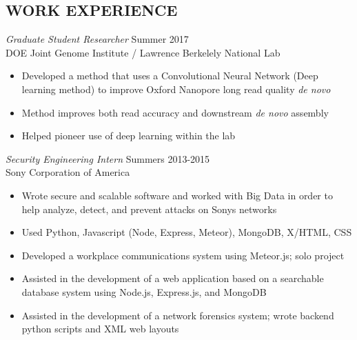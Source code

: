 \documentclass[margin, 10pt]{res} %
\begin{document}
\begin{resume}
 
\section{WORK EXPERIENCE}

{\sl Graduate Student Researcher} \hfill Summer 2017 \\ DOE Joint Genome Institute / Lawrence Berkelely National Lab

\begin{itemize} \itemsep -2pt %
\item Developed a method that uses a Convolutional Neural Network (Deep learning method) to improve Oxford Nanopore long read quality \emph{de novo}
\item Method improves both read accuracy and downstream \emph{de novo} assembly
\item Helped pioneer use of deep learning within the lab
\end{itemize}


{\sl Security Engineering Intern} \hfill Summers 2013-2015 \\
Sony Corporation of America 

\begin{itemize} \itemsep -2pt %
\item Wrote secure and scalable software and worked with Big Data in order to help analyze, detect, and prevent attacks on Sony\textsc{}s networks
\item Used Python, Javascript (Node, Express, Meteor), MongoDB, X/HTML, CSS 
\item Developed a workplace communications system using Meteor.js; solo project
\item Assisted in the development of a web application based on a searchable database system using Node.js, Express.js, and MongoDB
\item Assisted in the development of a network forensics system; wrote backend python scripts and XML web layouts
\end{itemize} 
 
 

\end{resume}
\end{document}
